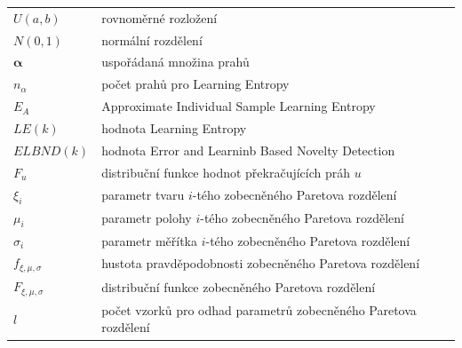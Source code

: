 \begin{tabular}{ll}
$U(a,b)$ & rovnoměrné rozložení \\
$N(0,1)$ & normální rozdělení\\
$\boldsymbol{\alpha}$             & uspořádaná množina prahů              \\
$n_{\alpha}$           & počet prahů pro Learning Entropy              \\
$E_A$             & Approximate Individual Sample Learning Entropy      \\
$LE(k)$           & hodnota Learning Entropy              \\
$ELBND(k)$             & hodnota Error and Learninb Based Novelty Detection\\
$F_u$    & distribuční funkce hodnot překračujících práh $u$             \\
$\xi_i$ & parametr tvaru $i$-tého zobecněného Paretova rozdělení\\     
$\mu_i$    & parametr polohy $i$-tého zobecněného Paretova rozdělení\\                   
$\sigma_i$ & parametr měřítka $i$-tého zobecněného Paretova rozdělení\\
$f_{\xi,\mu,\sigma}$ & hustota pravděpodobnosti zobecněného Paretova rozdělení\\
$F_{\xi,\mu,\sigma}$ & distribuční funkce zobecněného Paretova rozdělení\\
$l$    & počet vzorků pro odhad parametrů zobecněného Paretova rozdělení \\
\end{tabular}